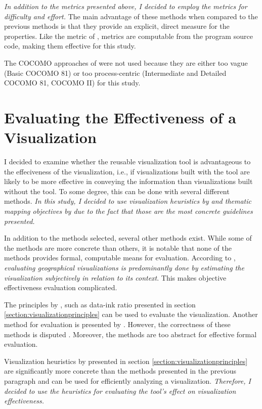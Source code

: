 \emph{In addition to the metrics presented above, I decided to employ the \citeauthor{halstead_elements_1977} metrics for difficulty and effort.} The main advantage of these methods when compared to the previous methods is that they provide an explicit, direct measure for the properties. Like the metric of \citeauthor{mccabe_complexity_1976}, \citeauthor{halstead_elements_1977} metrics are computable from the program source code, making them effective for this study.

The COCOMO approaches of \citet{boehm_software_1981} were not used because they are either too vague (Basic COCOMO 81) or too process-centric (Intermediate and Detailed COCOMO 81, COCOMO II) for this study.

\section{Evaluating the Effectiveness of a Visualization}

I decided to examine whether the reusable visualization tool is advantageous to the effeciveness of the visualization, i.e., if visualizations built with the tool are likely to be more effective in conveying the information than visualizations built without the tool. To some degree, this can be done with several different methods. \emph{In this study, I decided to use visualization heuristics by \citet{zuk_heuristics_2006} and thematic mapping objectives by \citet{schlichtmann_visualization_2002} due to the fact that those are the most concrete guidelines presented.}

In addition to the methods selected, several other methods exist. While some of the methods are more concrete than others, it is notable that none of the methods provides formal, computable means for evaluation. According to \citet{kraak_cartographic_1998}, \emph{evaluating geographical visualizations is predominantly done by estimating the visualization subjectively in relation to its context}. This makes objective effectiveness evaluation complicated.

The principles by \citet{tufte_visual_1986}, such as data-ink ratio presented in section \ref{section:visualizationprinciples} can be used to evaluate the visualization. Another method for evaluation is presented by \citet{azzam_j-b_2013}. However, the correctness of these methods is disputed \citep{kosslyn_graphics_1985,inbar_minimalism_2007}. Moreover, the methods are too abstract for effective formal evaluation.

Visualization heuristics by \citet{zuk_heuristics_2006} presented in section \ref{section:visualizationprinciples} are significantly more concrete than the methods presented in the previous paragraph and can be used for efficiently analyzing a visualization. \emph{Therefore, I decided to use the heuristics for evaluating the tool's effect on visualization effectiveness.}

